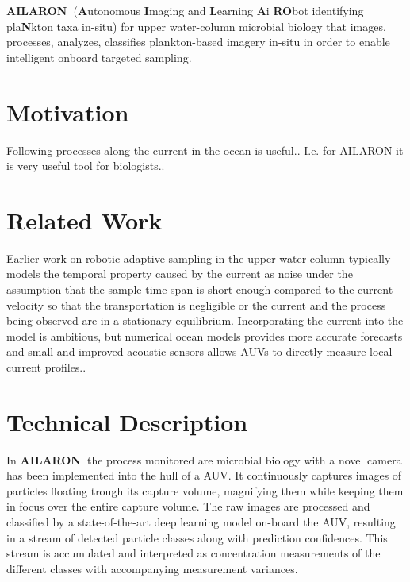 \documentclass[conference]{IEEEtran}
\def\proj{{\textbf{AILARON\ }}}
\newcommand{\cmt}[1]{{\color{red}{#1}}}
\begin{document}
\proj (\textbf{A}utonomous \textbf{I}maging and \textbf{L}earning
\textbf{A}i \textbf{RO}bot identifying pla\textbf{N}kton taxa in-situ)
for upper water-column microbial biology that images, processes,
analyzes, classifies plankton-based imagery in-situ in order to enable
intelligent onboard targeted sampling.

\section{Motivation}
Following processes along the current in the ocean is useful..
I.e. for AILARON it is very useful tool for biologists.. 

\section{Related Work}

Earlier work on robotic adaptive sampling in the upper water column
typically models the temporal property caused by the current as noise
under the assumption that the sample time-span is short enough
compared to the current velocity so that the transportation is
negligible or the current and the process being observed are in a
stationary equilibrium.  Incorporating the current into the model is
ambitious, but numerical ocean models provides more accurate forecasts
and small and improved acoustic sensors allows AUVs to directly
measure local current profiles.\cmt{give citations with a bibliography}.



\section{Technical Description}

In \proj the process monitored are microbial biology with a novel
camera has been implemented into the hull of a AUV.  It continuously
captures images of particles floating trough its capture volume,
magnifying them while keeping them in focus over the entire capture
volume.  The raw images are processed and classified by a
state-of-the-art deep learning model on-board the AUV, resulting in a
stream of detected particle classes along with prediction confidences.
This stream is accumulated and interpreted as concentration
measurements of the different classes with accompanying measurement
variances.
\end{document}
